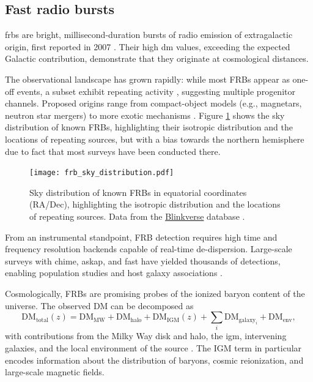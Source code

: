 \subsection{Fast radio bursts}
\label{sec:frbs}

\glspl{frb} are bright, millisecond-duration bursts of radio emission of extragalactic origin, first reported in 2007 \citep{Lorimer_2007}. Their high \gls{dm} values, exceeding the expected Galactic contribution, demonstrate that they originate at cosmological distances. 


The observational landscape has grown rapidly: while most FRBs appear as one-off events, a subset exhibit repeating activity \citep{Spitler_2016}, suggesting multiple progenitor channels. Proposed origins range from compact-object models (e.g., magnetars, neutron star mergers) to more exotic mechanisms \citep{Zhang2023physics}. Figure \ref{fig:frb_sky_distribution} shows the sky distribution of known FRBs, highlighting their isotropic distribution and the locations of repeating sources, but with a bias towards the northern hemisphere due to fact that most surveys have been conducted there.

\begin{figure}[h!]
	\centering
	\texttt{[image: frb\_sky\_distribution.pdf]}
	\caption[Sky distribution of known FRBs]{Sky distribution of known FRBs in equatorial coordinates (RA/Dec), highlighting the isotropic distribution and the locations of repeating sources. Data from the \href{https://blinkverse.zero2x.org/overview}{Blinkverse} database \citep{Blinkverse2023}.}
	\label{fig:frb_sky_distribution}
\end{figure}

From an instrumental standpoint, FRB detection requires high time and frequency resolution backends capable of real-time de-dispersion. Large-scale surveys with \gls{chime}, \gls{askap}, and \gls{fast} have yielded thousands of detections, enabling population studies and host galaxy associations \citep{CHIMEcatalog2021, Shannon_2025}.

Cosmologically, FRBs are promising probes of the ionized baryon content of the universe. The observed DM can be decomposed as
\begin{equation}
	\mathrm{DM}_{\text{total}}(z) = \mathrm{DM}_{\text{MW}} + \mathrm{DM}_{\text{halo}} + \mathrm{DM}_{\text{IGM}}(z) + \sum_i \mathrm{DM}_{\text{galaxy}_i} + \mathrm{DM}_{\text{env}} ,
	\label{eq:dm_total}
\end{equation}
with contributions from the Milky Way disk and halo, the \gls{igm}, intervening galaxies, and the local environment of the source \citep{Macquart_2020}. The IGM term in particular encodes information about the distribution of baryons, cosmic reionization, and large-scale magnetic fields.  

